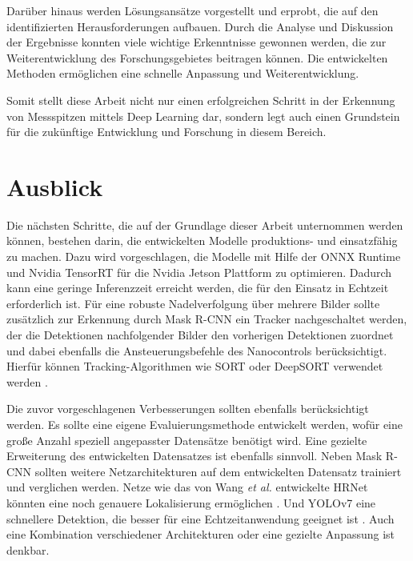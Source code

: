 Darüber hinaus werden Lösungsansätze vorgestellt und erprobt, die auf den identifizierten Herausforderungen aufbauen. Durch die Analyse und Diskussion der Ergebnisse konnten viele wichtige Erkenntnisse gewonnen werden, die zur Weiterentwicklung des Forschungsgebietes beitragen können.
Die entwickelten Methoden ermöglichen eine schnelle Anpassung und Weiterentwicklung.

Somit stellt diese Arbeit nicht nur einen erfolgreichen Schritt in der Erkennung von Messspitzen mittels Deep Learning dar, sondern legt auch einen Grundstein für die zukünftige Entwicklung und Forschung in diesem Bereich.

\section*{Ausblick}
Die nächsten Schritte, die auf der Grundlage dieser Arbeit unternommen werden können, bestehen darin, die entwickelten Modelle produktions- und einsatzfähig zu machen. Dazu wird vorgeschlagen, die Modelle mit Hilfe der ONNX Runtime \cite{onnxruntime} und Nvidia TensorRT \cite{tensorrt} für die Nvidia Jetson Plattform \cite{jetson} zu optimieren.
Dadurch kann eine geringe Inferenzzeit erreicht werden, die für den Einsatz in Echtzeit erforderlich ist.
Für eine robuste Nadelverfolgung über mehrere Bilder sollte zusätzlich zur Erkennung durch Mask R-CNN ein Tracker nachgeschaltet werden, der die Detektionen nachfolgender Bilder den vorherigen Detektionen zuordnet und dabei ebenfalls die Ansteuerungsbefehle des Nanocontrols berücksichtigt. Hierfür können Tracking-Algorithmen wie SORT oder DeepSORT verwendet werden \cite{Bewley2016_sort} \cite{Wojke2017simple}.

Die zuvor vorgeschlagenen Verbesserungen sollten ebenfalls berücksichtigt werden.
Es sollte eine eigene Evaluierungsmethode entwickelt werden, wofür eine große Anzahl speziell angepasster Datensätze benötigt wird.
Eine gezielte Erweiterung des entwickelten Datensatzes ist ebenfalls sinnvoll.
Neben Mask R-CNN sollten weitere Netzarchitekturen auf dem entwickelten Datensatz trainiert und verglichen werden. Netze wie das von Wang \textit{et al.} entwickelte HRNet könnten eine noch genauere Lokalisierung ermöglichen \cite{SunXLW19} \cite{wang2019deep}. Und YOLOv7 eine schnellere Detektion, die besser für eine Echtzeitanwendung geeignet ist \cite{Wang_2023_CVPR}.
Auch eine Kombination verschiedener Architekturen oder eine gezielte Anpassung ist denkbar.
